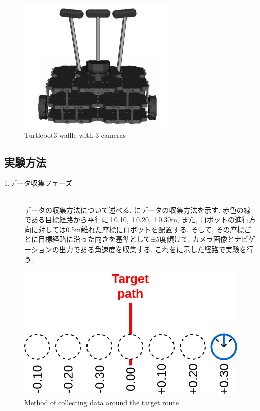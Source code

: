 \begin{figure}[h]
  \centering
  \includegraphics[keepaspectratio, scale=0.55]{images/turtlebot3.png}
  \caption{Turtlebot3 waffle with 3 cameras}
  \label{Fig:turtlebot3}
  \end{figure}

\newpage
\subsection{実験方法}
\begin{description}
  \item[1.データ収集フェーズ]\mbox{}\\データの収集方法について述べる. にデータの収集方法を示す. 赤色の線である目標経路から平行に±0.10, ±0.20, ±0.30m, また, ロボットの進行方向に対しては0.5m離れた座標にロボットを配置する. そして, その座標ごとに目標経路に沿った向きを基準として±5度傾けて, カメラ画像とナビゲーションの出力である角速度を収集する. これをに示した経路で実験を行う. 
\end{description}

\begin{figure}[h]
  \centering
  \includegraphics[keepaspectratio, scale=0.25]{images/old-method.png}
  \caption{Method of collecting data around the target route}
  \label{Fig:old-method}
  \end{figure}

